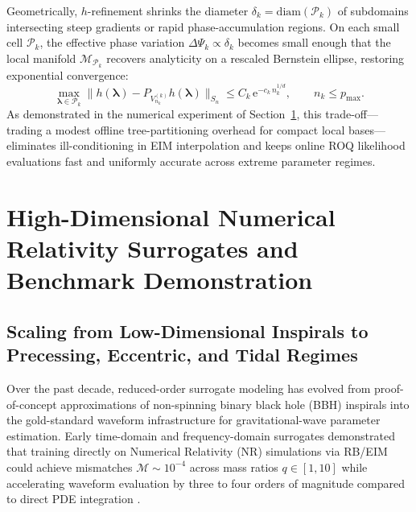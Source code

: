 \documentclass[11pt, a4paper]{article}
\begin{document}
Geometrically, $h$-refinement shrinks the diameter $\delta_k = \mathrm{diam}(\mathcal{P}_k)$ of subdomains intersecting steep gradients or rapid phase-accumulation regions. On each small cell $\mathcal{P}_k$, the effective phase variation $\Delta \Psi_k \propto \delta_k$ becomes small enough that the local manifold $\mathcal{M}_{\mathcal{P}_k}$ recovers analyticity on a rescaled Bernstein ellipse, restoring exponential convergence:
\begin{equation}
\max_{\boldsymbol{\lambda} \in \mathcal{P}_k} \bigl\| h(\boldsymbol{\lambda}) - P_{V_{n_k}^{(k)}} h(\boldsymbol{\lambda}) \bigr\|_{S_n} \le C_k \, \mathrm{e}^{-c_k \, n_k^{1/d}} , \qquad n_k \le p_{\max} .
\label{eq:local_exponential}
\end{equation}
As demonstrated in the numerical experiment of Section~\ref{sec:benchmark}, this trade-off---trading a modest offline tree-partitioning overhead for compact local bases---eliminates ill-conditioning in EIM interpolation and keeps online ROQ likelihood evaluations fast and uniformly accurate across extreme parameter regimes.

\section{High-Dimensional Numerical Relativity Surrogates and Benchmark Demonstration}
\label{sec:benchmark}

\subsection{Scaling from Low-Dimensional Inspirals to Precessing, Eccentric, and Tidal Regimes}

Over the past decade, reduced-order surrogate modeling has evolved from proof-of-concept approximations of non-spinning binary black hole (BBH) inspirals into the gold-standard waveform infrastructure for gravitational-wave parameter estimation. Early time-domain and frequency-domain surrogates demonstrated that training directly on Numerical Relativity (NR) simulations via RB/EIM could achieve mismatches $\mathcal{M} \sim 10^{-4}$ across mass ratios $q \in [1, 10]$ while accelerating waveform evaluation by three to four orders of magnitude compared to direct PDE integration \cite{Field2014,Purrer2014,Purrer2016}.
\end{document}
